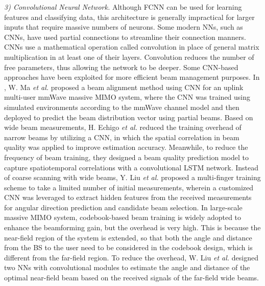 \documentclass[journal,comsoc]{IEEEtran}
\begin{document}
\emph{3) Convolutional Neural Network.} Although FCNN can be used for learning features and classifying data, this architecture is generally impractical for larger inputs that require massive numbers of neurons. Some modern NNs, such as CNNs, have used partial connections to streamline their connection manners. CNNs use a mathematical operation called convolution in place of general matrix multiplication in at least one of their layers. Convolution reduces the number of free parameters, thus allowing the network to be deeper. Some CNN-based approaches have been exploited for more efficient beam management purposes. In \cite{Machine-Learning-Beam-Alignment-MIMO-2020}, W. Ma \emph{et al.} proposed a beam alignment method using CNN for an uplink multi-user mmWave massive MIMO system, where the CNN was trained using simulated environments according to the mmWave channel model and then deployed to predict the beam distribution vector using partial beams. Based on wide beam measurements, H. Echigo \emph{et al.} \cite{A-Deep-Learning-Low-Overhead-Beam-Selection-2021} reduced the training overhead of narrow beams by utilizing a CNN, in which the spatial correlation in beam quality was applied to improve estimation accuracy. Meanwhile, to reduce the frequency of beam training, they designed a beam quality prediction model to capture spatiotemporal correlations with a convolutional LSTM network. Instead of coarse scanning with wide beams, Y. Liu \emph{et al.} \cite{Deep-Learning-Multi-Finger-Beam-Training-2023} proposed a multi-finger training scheme to take a limited number of initial measurements, wherein a customized CNN was leveraged to extract hidden features from the received measurements for angular direction prediction and candidate beam selection. In large-scale massive MIMO system, codebook-based beam training is widely adopted to enhance the beamforming gain, but the overhead is very high. This is because the near-field region \cite{Fraunhofer-Fresnel-Distances} of the system is extended, so that both the angle and distance from the BS to the user need to be considered in the codebook design, which is different from the far-field region. To reduce the overhead, W. Liu \emph{et al.} \cite{Deep-Learning-Beam-Training-Large-Scale-2023} designed two NNs with convolutional modules to estimate the angle and distance of the optimal near-field beam based on the received signals of the far-field wide beams.
\end{document}
